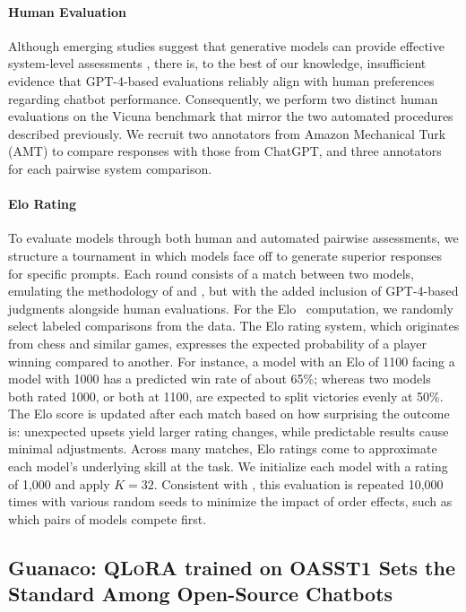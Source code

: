 \paragraph{Human Evaluation} Although emerging studies suggest that generative models can provide effective system-level assessments \citep{fu2023gptscore}, there is, to the best of our knowledge, insufficient evidence that GPT-4-based evaluations reliably align with human preferences regarding chatbot performance. Consequently, we perform two distinct human evaluations on the Vicuna benchmark that mirror the two automated procedures described previously. We recruit two annotators from Amazon Mechanical Turk (AMT) to compare responses with those from ChatGPT, and three annotators for each pairwise system comparison.

\paragraph{Elo Rating} To evaluate models through both human and automated pairwise assessments, we structure a tournament in which models face off to generate superior responses for specific prompts. Each round consists of a match between two models, emulating the methodology of \citet{bai2022training} and \citet{vicuna2023}, but with the added inclusion of GPT-4-based judgments alongside human evaluations. For the Elo~\citep{elo1967proposed,elo1978rating} computation, we randomly select labeled comparisons from the data. The Elo rating system, which originates from chess and similar games, expresses the expected probability of a player winning compared to another. For instance, a model with an Elo of 1100 facing a model with 1000 has a predicted win rate of about 65\%; whereas two models both rated 1000, or both at 1100, are expected to split victories evenly at 50\%. The Elo score is updated after each match based on how surprising the outcome is: unexpected upsets yield larger rating changes, while predictable results cause minimal adjustments. Across many matches, Elo ratings come to approximate each model's underlying skill at the task. We initialize each model with a rating of 1,000 and apply $K=32$. Consistent with \citet{vicuna2023}, this evaluation is repeated 10,000 times with various random seeds to minimize the impact of order effects, such as which pairs of models compete first.

\subsection{\textbf{Guanaco}: \textsc{QLoRA} trained on OASST1 Sets the Standard Among Open-Source Chatbots} 

